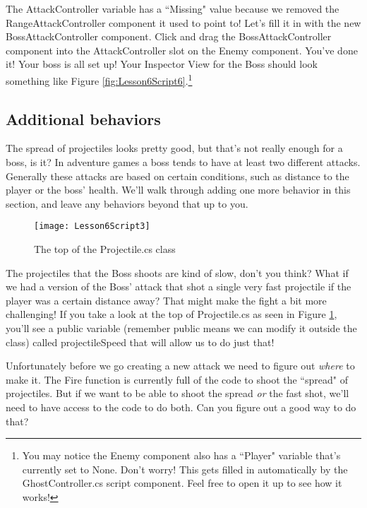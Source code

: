 \documentclass{article}
\begin{document}
The AttackController variable has a ``Missing" value because we removed the RangeAttackController component it used to point to! Let's fill it in with the new BossAttackController component. Click and drag the BossAttackController component into the AttackController slot on the Enemy component. You've done it! Your boss is all set up! Your Inspector View for the Boss should look something like Figure \ref{fig:Lesson6Script6}.\footnote{You may notice the Enemy component also has a ``Player" variable that's currently set to None. Don't worry! This gets filled in automatically by the GhostController.cs script component. Feel free to open it up to see how it works!}

\noindent{}

\subsection{Additional behaviors}

The spread of projectiles looks pretty good, but that's not really enough for a boss, is it? In adventure games a boss tends to have at least two different attacks. Generally these attacks are based on certain conditions, such as distance to the player or the boss' health. We'll walk through adding one more behavior in this section, and leave any behaviors beyond that up to you. 

 \begin{figure}
  \texttt{[image: Lesson6Script3]}
  \caption{The top of the Projectile.cs class}
  \label{fig:Lesson6Script3}
\end{figure}

 The projectiles that the Boss shoots are kind of slow, don't you think? What if we had a version of the Boss' attack that shot a single very fast projectile if the player was a certain distance away? That might make the fight a bit more challenging! If you take a look at the top of Projectile.cs as seen in Figure \ref{fig:Lesson6Script3}, you'll see a public variable (remember public means we can modify it outside the class) called projectileSpeed that will allow us to do just that! 
 
Unfortunately before we go creating a new attack we need to figure out \textit{where} to make it. The Fire function is currently full of the code to shoot the ``spread" of projectiles. But if we want to be able to shoot the spread \textit{or} the fast shot, we'll need to have access to the code to do both. Can you figure out a good way to do that? 
\end{document}
